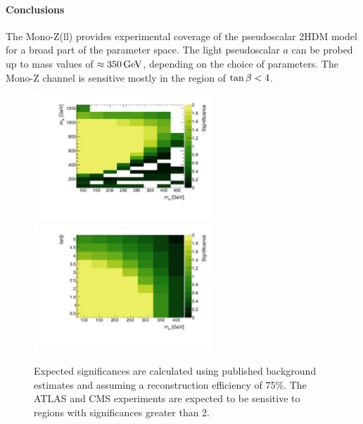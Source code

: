 

\paragraph{Conclusions} The Mono-Z(ll) provides experimental coverage of the pseudoscalar 2HDM model for a broad part of the parameter space. The light pseudoscalar $a$ can be probed up to mass values of $\approx\unit[350]{GeV}$, depending on the choice of parameters. The Mono-Z channel is sensitive mostly in the region of $\tan\beta<4$.










\begin{figure}
\centering
\includegraphics[width=0.6\textwidth]{texinputs/04_grid/figures/monoz/leptonic/mAma_Significance_ll.pdf}
\includegraphics[width=0.6\textwidth]{texinputs/04_grid/figures/monoz/leptonic/tanbma_Significance_ll.pdf}
\caption{Expected significances are calculated using published background estimates and assuming a reconstruction efficiency of 75\%.  The ATLAS and CMS experiments are expected to be sensitive to regions with significances greater than 2.}
\label{fig:expected_significance_monozll}
\end{figure}

